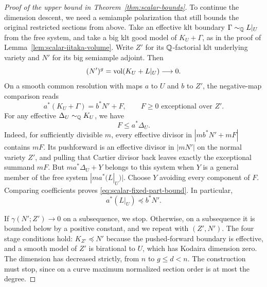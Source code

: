 \begin{proof}[Proof of the upper bound in Theorem~\ref{thm:scalar-bounds}]
To continue the dimension descent, we need a semiample polarization
that still bounds the original restricted sections from above.
Take an effective klt boundary $\Gamma\sim_{\mathbb Q}L|_U$ from the free
system, and take a big klt good model of $K_U+\Gamma$, as in the proof
of Lemma~\ref{lem:scalar-iitaka-volume}.
Write $Z'$ for its $\mathbb Q$-factorial klt underlying variety and $N'$
for its big semiample adjoint.  Then
\[
 (N')^g=\operatorname{vol}(K_U+L|_U)\longrightarrow0.
\]
On a smooth common resolution with maps $a$ to $U$ and $b$ to $Z'$,
the negative-map comparison reads
\begin{equation}\label{eq:scalar-good-model-comparison}
 a^*(K_U+\Gamma)=b^*N'+F,
 \qquad F\ge0\text{ exceptional over }Z'.
\end{equation}
For any effective $\Delta_U\sim_{\mathbb Q}K_U$, we have
\begin{equation}\label{eq:scalar-fixed-part-bound}
 F\le a^*\Delta_U.
\end{equation}
Indeed, for sufficiently divisible $m$, every effective divisor in
$|mb^*N'+mF|$ contains $mF$.  Its pushforward is an effective divisor
in $|mN'|$ on the normal variety $Z'$, and pulling that Cartier divisor
back leaves exactly the exceptional summand $mF$.  But
$ma^*\Delta_U+Y$ belongs to this system when $Y$ is a general member
of the free system $|ma^*(L|_U)|$.  Choose $Y$ avoiding every component
of $F$.  Comparing coefficients proves
\eqref{eq:scalar-fixed-part-bound}.  In particular,
\begin{equation}\label{eq:scalar-polarization-domination}
 a^*(L|_U)\preceq b^*N'.
\end{equation}

If $\gamma(N';Z')\to0$ on a subsequence, we stop.  Otherwise, on a
subsequence it is bounded below by a positive constant, and we repeat
with $(Z',N')$.  The four stage conditions hold: $K_{Z'}\preceq N'$
because the pushed-forward boundary is effective, and a smooth model
of $Z'$ is birational to $U$, which has Kodaira dimension zero.
The dimension has decreased strictly, from $n$ to $g\le d<n$.
The construction must stop, since on a curve maximum normalized
section order is at most the degree.


\end{proof}
